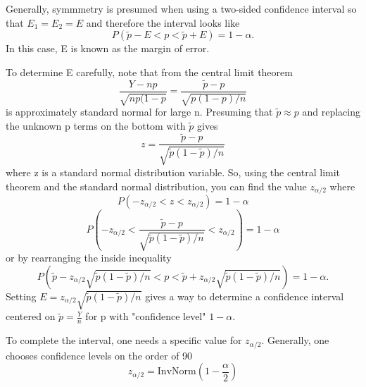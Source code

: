 \documentclass[10pt,]{book}
\theoremstyle{plain}
\theoremstyle{definition}
\theoremstyle{definition}
\theoremstyle{definition}
\numberwithin{equation}{section}
\newcommand{\lt}{ < }
\begin{document}
Generally, symmmetry is presumed when using a two-sided confidence interval so that \(E_1 = E_2 = E\) and therefore the interval looks like
\begin{equation*}P(\tilde{p} - E \lt p \lt \tilde{p} + E) = 1 - \alpha.\end{equation*}
In this case, E is known as the margin of error.
%
\par

To determine E carefully, note that from the central limit theorem
\begin{equation*}\frac{Y-np}{\sqrt{np(1-p}} = \frac{\tilde{p} - p}{\sqrt{p(1-p)/n}}\end{equation*}
is approximately standard normal for large n.  Presuming that \(\tilde{p} \approx p\) and replacing the unknown p terms on the bottom with \(\tilde{p}\) gives 
\begin{equation*}z = \frac{\tilde{p} - p}{\sqrt{\tilde{p}(1-\tilde{p})/n}}\end{equation*}
where z is a standard normal distribution variable. So, using the central limit theorem and the standard normal distribution, you can find the value \( z_{ \alpha/2}\) where
\begin{equation*}P( -z_{ \alpha/2} \lt z \lt z_{ \alpha/2}) = 1 - \alpha\end{equation*}
\begin{equation*}P( -z_{ \alpha/2} \lt \frac{\tilde{p} - p}{\sqrt{\tilde{p}(1-\tilde{p})/n}} \lt z_{ \alpha/2}) = 1 - \alpha\end{equation*}
or by rearranging the inside inequality
\begin{equation*}P( \tilde{p} - z_{ \alpha/2}\sqrt{\tilde{p}(1-\tilde{p})/n} \lt  p \lt \tilde{p} + z_{ \alpha/2}\sqrt{\tilde{p}(1-\tilde{p})/n}) = 1 - \alpha.\end{equation*}
Setting \(E = z_{ \alpha/2}\sqrt{\tilde{p}(1-\tilde{p})/n}\) gives a way to determine a confidence interval centered on \(\tilde{p} = \frac{Y}{n}\) for p with "confidence level" \(1-\alpha\).  
%
\par

To complete the interval, one needs a specific value for \(z_{ \alpha/2}\).
Generally, one chooses confidence levels on the order of 90%
\begin{equation*}z_{\alpha /2} = \text{InvNorm}( 1 - \frac{\alpha}{2} )\end{equation*}
\end{document}
